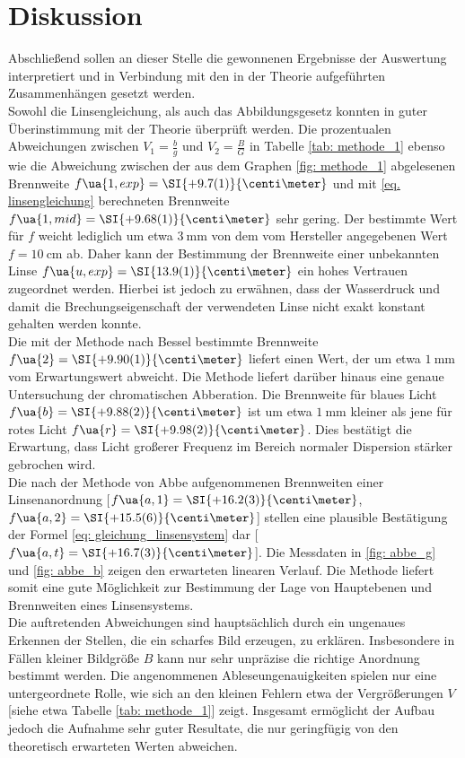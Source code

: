 \section{Diskussion}
Abschließend sollen an dieser Stelle die gewonnenen Ergebnisse der Auswertung interpretiert und
in Verbindung mit den in der Theorie aufgeführten Zusammenhängen gesetzt werden.\\
Sowohl die Linsengleichung, als auch das Abbildungsgesetz konnten in guter Überinstimmung
mit der Theorie überprüft werden. Die prozentualen Abweichungen zwischen $V_1 = \frac{b}{g}$ und $V_2 = \frac{B}{G}$
in Tabelle \ref{tab: methode_1} ebenso wie die Abweichung zwischen der aus dem Graphen \ref{fig: methode_1} abgelesenen Brennweite $f\ua{1, exp} = \SI{+9.7(1)}{\centi\meter}$ und mit \eqref{eq. linsengleichung}
berechneten Brennweite $f\ua{1, mid} = \SI{+9.68(1)}{\centi\meter}$ sehr gering. Der bestimmte Wert für $f$ weicht lediglich um etwa $\SI{3}{\milli\meter}$ von dem vom Hersteller
angegebenen Wert $f = \SI{10}{\centi\meter}$ ab. Daher kann der Bestimmung der Brennweite einer unbekannten Linse $  f\ua{u, exp} = \SI{13.9(1)}{\centi\meter}$
ein hohes Vertrauen zugeordnet werden. Hierbei ist jedoch zu erwähnen, dass der Wasserdruck und damit die Brechungseigenschaft der
verwendeten Linse nicht exakt konstant gehalten werden konnte. \\
Die mit der Methode nach Bessel bestimmte Brennweite $f\ua{2} = \SI{+9.90(1)}{\centi\meter}$ liefert einen Wert, der um etwa $\SI{1}{\milli\meter}$ vom Erwartungswert abweicht. Die Methode
liefert darüber hinaus eine genaue Untersuchung der chromatischen Abberation. Die Brennweite für blaues Licht $f\ua{b} = \SI{+9.88(2)}{\centi\meter}$ ist um etwa
$\SI{1}{\milli\meter}$ kleiner als jene für rotes Licht $f\ua{r} = \SI{+9.98(2)}{\centi\meter}$. Dies bestätigt die Erwartung, dass Licht großerer Frequenz im Bereich
normaler Dispersion stärker gebrochen wird.\\
Die nach der Methode von Abbe aufgenommenen Brennweiten einer Linsenanordnung [$f\ua{a, 1} = \SI{+16.2(3)}{\centi\meter}$, $f\ua{a, 2} = \SI{+15.5(6)}{\centi\meter}$] stellen eine plausible Bestätigung der Formel
\eqref{eq: gleichung_linsensystem} dar [$f\ua{a, t} = \SI{+16.7(3)}{\centi\meter}$]. Die Messdaten in \ref{fig: abbe_g} und \ref{fig: abbe_b} zeigen den erwarteten linearen Verlauf.
Die Methode liefert somit eine gute Möglichkeit zur Bestimmung der Lage von Hauptebenen und Brennweiten eines Linsensystems.\\
Die auftretenden Abweichungen sind hauptsächlich durch ein ungenaues Erkennen der Stellen, die ein scharfes Bild erzeugen, zu erklären.
Insbesondere in Fällen kleiner Bildgröße $B$ kann nur sehr unpräzise die richtige Anordnung bestimmt werden. Die angenommenen Ableseungenauigkeiten
spielen nur eine untergeordnete Rolle, wie sich an den kleinen Fehlern etwa der Vergrößerungen $V$ [siehe etwa Tabelle \ref{tab: methode_1}] zeigt.
Insgesamt ermöglicht der Aufbau jedoch die Aufnahme sehr guter Resultate, die nur geringfügig von den theoretisch erwarteten Werten abweichen.
